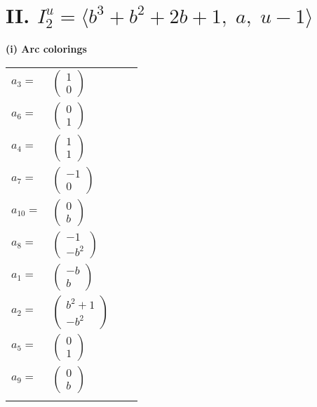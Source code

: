 \documentclass[1p]{elsarticle_modified}
\theoremstyle{definition}
\begin{document}
\centering \section*{II. $I^u_{2}= \langle b^3+b^2+2 b+1,\;a,\;u-1 \rangle$}
\flushleft \textbf{(i) Arc colorings}\\
\begin{tabular}{m{7pt} m{180pt} m{7pt} m{180pt} }
\flushright $a_{3}=$&$\begin{pmatrix}1\\0\end{pmatrix}$ \\
\flushright $a_{6}=$&$\begin{pmatrix}0\\1\end{pmatrix}$ \\
\flushright $a_{4}=$&$\begin{pmatrix}1\\1\end{pmatrix}$ \\
\flushright $a_{7}=$&$\begin{pmatrix}-1\\0\end{pmatrix}$ \\
\flushright $a_{10}=$&$\begin{pmatrix}0\\b\end{pmatrix}$ \\
\flushright $a_{8}=$&$\begin{pmatrix}-1\\- b^2\end{pmatrix}$ \\
\flushright $a_{1}=$&$\begin{pmatrix}- b\\b\end{pmatrix}$ \\
\flushright $a_{2}=$&$\begin{pmatrix}b^2+1\\- b^2\end{pmatrix}$ \\
\flushright $a_{5}=$&$\begin{pmatrix}0\\1\end{pmatrix}$ \\
\flushright $a_{9}=$&$\begin{pmatrix}0\\b\end{pmatrix}$\\&\end{tabular}
\end{document}

